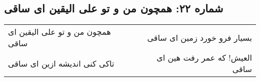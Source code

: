 \begin{center}
\section*{شماره ۲۲: همچون من و تو علی الیقین ای ساقی}
\label{sec:022}
\begin{longtable}{l p{0.5cm} r}
همچون من و تو علی الیقین ای ساقی
&&
بسیار فرو خورد زمین ای ساقی
\\
تاکی کنی اندیشه ازین ای ساقی
&&
العیش! که عمر رفت هین ای ساقی
\\
\end{longtable}
\end{center}
